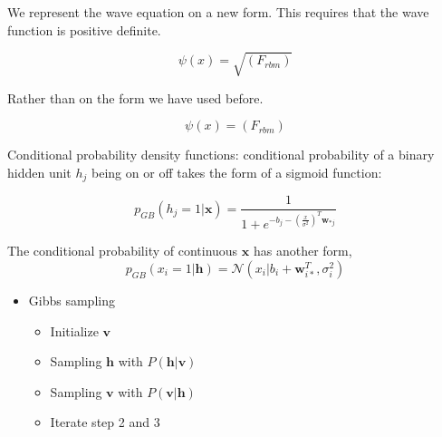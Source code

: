 We represent the wave equation on a new form. This requires that the wave function is positive definite. 

\begin{equation}\label{eq:Gibbs}
\psi(x) = \sqrt{(F_{rbm})}
\end{equation}

Rather than on the form we have used before.

\begin{equation}\label{eq:Gibbs_new}
\psi(x) = (F_{rbm})
\end{equation}

Conditional probability density functions: 
conditional probability of a binary hidden unit $h_j$ being on or off takes the form of a sigmoid function:

\begin{equation}
p_{GB}(h_j = 1|\mathbf{x}) = \frac{1}{1 + e^{-b_j - (\frac{x}{\sigma^2})^T \mathbf{w}_{*j} }}
\end{equation}

The conditional probability of continuous $\mathbf{x}$ has another form,
\begin{equation}
p_{GB}(x_i = 1|\mathbf{h}) = \mathcal{N}(x_i|b_i +  \mathbf{w}^T_{i*}, \sigma^2_i)
\end{equation}


\begin{itemize}
    \item Gibbs sampling 
\begin{itemize}
    \item Initialize $\mathbf{v}$
    \item Sampling $\mathbf{h}$ with $P(\mathbf{h}|\mathbf{v})$
    \item Sampling $\mathbf{v}$ with $P(\mathbf{v}|\mathbf{h})$
    \item Iterate step 2 and 3
\end{itemize}
\end{itemize}
